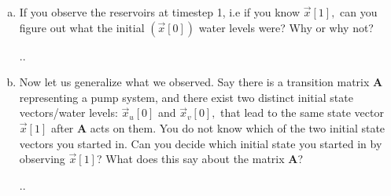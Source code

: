 \documentclass[11pt]{article}
\def\A{\textbf{A}} %
\begin{document}
\begin{enumerate}
\begin{enumerate}[(a)]
	      	      \newpage
	      	                  
	      	\item If you observe the reservoirs at timestep 1, i.e if you know $\vec x[1],$ can you figure out what the initial $(\vec x[0])$ water levels were? Why or why not?
	      	      \begin{Answer}
	      	      	..
	      	      \end{Answer}
	      	                  
	      	      \newpage
	      	                  
	      	\item Now let us generalize what we observed. Say there is a transition matrix $\A$ representing a pump system, and there exist two distinct initial state vectors/water levels: $\vec x_u[0]$ and $\vec x_v[0],$ that lead to the same state vector $\vec x[1]$ after $\A$ acts on them. You do not know which of the two initial state vectors you started in. Can you decide which initial state you started in by observing $\vec x[1]$? What does this say about the matrix $\A$?
	      	      \begin{Answer}
	      	      	..
	      	      \end{Answer}
	      	                  
	      	      \newpage
	      	                  

\end{enumerate}
\end{enumerate}
\end{document}
